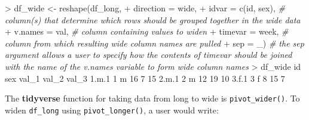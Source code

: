 \documentclass[
]{book}
\newenvironment{Shaded}{\begin{snugshade}}{\end{snugshade}}
\newcommand{\AttributeTok}[1]{\textcolor[rgb]{0.77,0.63,0.00}{#1}}
\newcommand{\CommentTok}[1]{\textcolor[rgb]{0.56,0.35,0.01}{\textit{#1}}}
\newcommand{\DecValTok}[1]{\textcolor[rgb]{0.00,0.00,0.81}{#1}}
\newcommand{\FloatTok}[1]{\textcolor[rgb]{0.00,0.00,0.81}{#1}}
\newcommand{\FunctionTok}[1]{\textcolor[rgb]{0.00,0.00,0.00}{#1}}
\newcommand{\NormalTok}[1]{#1}
\newcommand{\OtherTok}[1]{\textcolor[rgb]{0.56,0.35,0.01}{#1}}
\newcommand{\SpecialCharTok}[1]{\textcolor[rgb]{0.00,0.00,0.00}{#1}}
\newcommand{\StringTok}[1]{\textcolor[rgb]{0.31,0.60,0.02}{#1}}
\begin{document}
\begin{Shaded}
\begin{Highlighting}[]
\SpecialCharTok{\textgreater{}}\NormalTok{ df\_wide }\OtherTok{\textless{}{-}} \FunctionTok{reshape}\NormalTok{(df\_long,}
\SpecialCharTok{+}                    \AttributeTok{direction =} \StringTok{\textquotesingle{}wide\textquotesingle{}}\NormalTok{,}
\SpecialCharTok{+}                    \AttributeTok{idvar =} \FunctionTok{c}\NormalTok{(}\StringTok{\textquotesingle{}id\textquotesingle{}}\NormalTok{, }\StringTok{\textquotesingle{}sex\textquotesingle{}}\NormalTok{), }\CommentTok{\# column(s) that determine which rows should be grouped together in the wide data}
\SpecialCharTok{+}                    \AttributeTok{v.names =} \StringTok{\textquotesingle{}val\textquotesingle{}}\NormalTok{, }\CommentTok{\# column containing values to widen}
\SpecialCharTok{+}                    \AttributeTok{timevar =} \StringTok{\textquotesingle{}week\textquotesingle{}}\NormalTok{, }\CommentTok{\# column from which resulting wide column names are pulled}
\SpecialCharTok{+}                    \AttributeTok{sep =} \StringTok{\textquotesingle{}\_\textquotesingle{}}\NormalTok{) }\CommentTok{\# the \textasciigrave{}sep\textasciigrave{} argument allows a user to specify how the contents of \textasciigrave{}timevar\textasciigrave{} should be joined with the name of the \textasciigrave{}v.names\textasciigrave{} variable to form wide column names}
\SpecialCharTok{\textgreater{}}\NormalTok{ df\_wide}
\NormalTok{      id sex val\_1 val\_2 val\_3}
\FloatTok{1.}\NormalTok{m}\FloatTok{.1}  \DecValTok{1}\NormalTok{   m    }\DecValTok{16}     \DecValTok{7}    \DecValTok{15}
\FloatTok{2.}\NormalTok{m}\FloatTok{.1}  \DecValTok{2}\NormalTok{   m    }\DecValTok{12}    \DecValTok{19}    \DecValTok{10}
\FloatTok{3.}\NormalTok{f}\FloatTok{.1}  \DecValTok{3}\NormalTok{   f     }\DecValTok{8}    \DecValTok{15}     \DecValTok{7}
\end{Highlighting}
\end{Shaded}

The \textbf{tidyverse} function for taking data from long to wide is \texttt{pivot\_wider()}. To widen \texttt{df\_long} using \texttt{pivot\_longer()}, a user would write:
\end{document}
